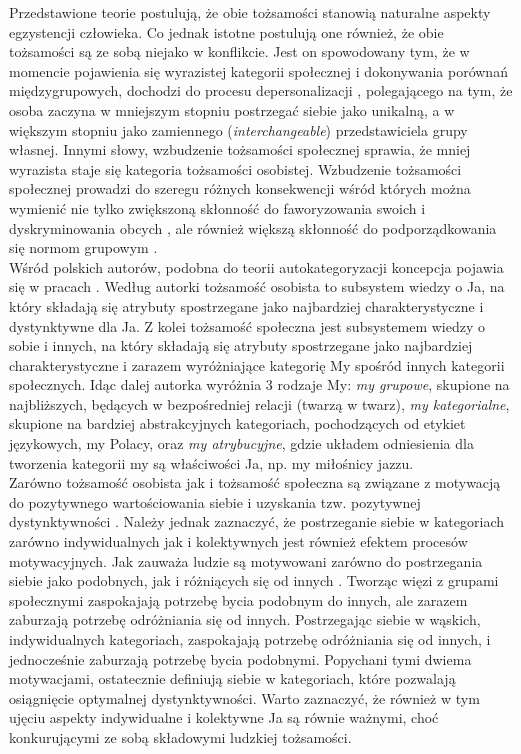 \documentclass[man]{apa6}
\begin{document}
Przedstawione teorie postulują, że obie tożsamości stanowią naturalne aspekty egzystencji człowieka. Co jednak istotne postulują one również, że obie tożsamości są ze sobą niejako w konflikcie. Jest on spowodowany tym, że w momencie pojawienia się wyrazistej kategorii społecznej i dokonywania porównań międzygrupowych, dochodzi do procesu depersonalizacji \parencite[zob. np.,][]{turner1994self}, polegającego na tym, że osoba zaczyna w mniejszym stopniu postrzegać siebie jako unikalną, a w większym stopniu jako zamiennego (\emph{interchangeable}) przedstawiciela grupy własnej. Innymi słowy, wzbudzenie tożsamości społecznej sprawia, że mniej wyrazista staje się kategoria tożsamości osobistej. Wzbudzenie tożsamości społecznej prowadzi do szeregu różnych konsekwencji wśród których można wymienić nie tylko zwiększoną skłonność do faworyzowania swoich i dyskryminowania obcych \parencite{tajfel1986social}, ale również większą skłonność do podporządkowania się normom grupowym \parencite{reicher1995social}. \\

Wśród polskich autorów, podobna do teorii autokategoryzacji koncepcja pojawia się w pracach \textcite{jarymowicz1994poznawcza}. Według autorki tożsamość osobista to subsystem wiedzy o Ja, na który składają się atrybuty spostrzegane jako najbardziej charakterystyczne i dystynktywne dla Ja. Z kolei tożsamość społeczna jest subsystemem wiedzy o sobie i innych, na który składają się atrybuty spostrzegane jako najbardziej charakterystyczne i zarazem wyróżniające kategorię My spośród innych kategorii społecznych. Idąc dalej autorka wyróżnia 3 rodzaje My: \emph{my grupowe}, skupione na najbliższych, będących w bezpośredniej relacji (twarzą w twarz), \emph{my kategorialne},
skupione na bardziej abstrakcyjnych kategoriach, pochodzących od etykiet językowych, my Polacy, oraz \emph{my atrybucyjne}, gdzie układem odniesienia dla tworzenia kategorii my są właściwości Ja, np. my miłośnicy jazzu.\\

Zarówno tożsamość osobista jak i tożsamość społeczna są związane z motywacją do pozytywnego wartościowania siebie i uzyskania tzw. pozytywnej dystynktywności \parencite{tajfel1986social}. Należy jednak zaznaczyć, że postrzeganie siebie w kategoriach zarówno indywidualnych jak i kolektywnych jest również efektem procesów motywacyjnych. Jak zauważa \textcite{brewer1991social} ludzie są motywowani zarówno do postrzegania siebie jako podobnych, jak i różniących się od innych \parencite[patrz również,][]{brewer2007importance}. Tworząc więzi z grupami społecznymi zaspokajają potrzebę bycia podobnym do innych, ale zarazem zaburzają potrzebę odróżniania się od innych. Postrzegając siebie w wąskich, indywidualnych kategoriach, zaspokajają potrzebę odróżniania się od innych, i jednocześnie zaburzają potrzebę bycia podobnymi. Popychani tymi dwiema motywacjami, ostatecznie definiują siebie w kategoriach, które pozwalają osiągnięcie optymalnej dystynktywności. Warto zaznaczyć, że również w tym ujęciu aspekty indywidualne i kolektywne Ja są równie ważnymi, choć konkurującymi ze sobą składowymi ludzkiej tożsamości.\\
\end{document}
